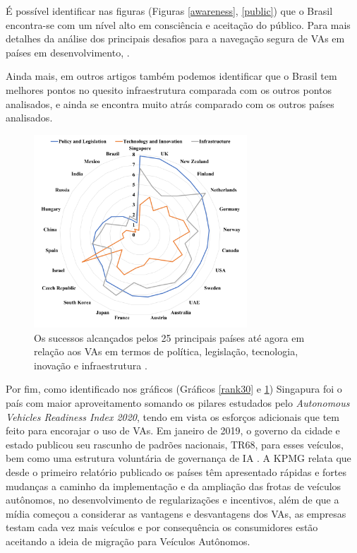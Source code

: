 É possível identificar nas figuras (Figuras \ref{awareness}, \ref{public}) que o Brasil encontra-se com um nível alto em consciência e aceitação do público. Para mais detalhes da análise dos principais desafios para a navegação segura de VAs em países em desenvolvimento, \cite{mundobrasil}.

Ainda mais, em outros artigos também podemos identificar que o Brasil tem melhores pontos no quesito infraestrutura comparada com os outros pontos analisados, e ainda se encontra muito atrás comparado com os outros países analisados.

\begin{figure}[H]
\centering
\includegraphics[width=8cm]{Figures/future.png}
\caption{Os sucessos alcançados pelos 25 principais países até agora em relação aos VAs em termos de política, legislação, tecnologia, inovação e infraestrutura \cite{future-view}.}
\label{figura_future-view}
\end{figure}



Por fim, como identificado nos gráficos (Gráficos \ref{rank30} e \ref{figura_future-view}) Singapura foi o país com maior aproveitamento somando os pilares estudados pelo \textit{Autonomous Vehicles Readiness Index 2020}, tendo em vista os esforços adicionais que tem feito para encorajar o uso de VAs. Em janeiro de 2019, o governo da cidade e estado publicou seu rascunho de padrões nacionais, TR68, para esses veículos, bem como uma estrutura voluntária de governança de IA \cite{KPMG}. A KPMG relata que desde o primeiro relatório publicado os países têm apresentado rápidas e fortes mudanças a caminho da implementação e da ampliação das frotas de veículos autônomos, no desenvolvimento de regularizações e incentivos, além de que a mídia começou a considerar as vantagens e desvantagens dos VAs, as empresas testam cada vez mais veículos e por consequência os consumidores estão aceitando a ideia de migração para Veículos Autônomos.

